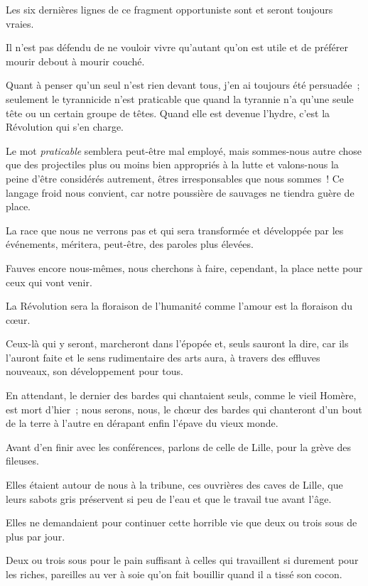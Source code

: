 \documentclass[french,twoside]{book} %
\begin{document}
\noindent Les six dernières lignes de ce fragment opportuniste sont et seront toujours vraies.\par
Il n’est pas défendu de ne vouloir vivre qu’autant qu’on est utile et de préférer mourir debout à mourir couché.\par
Quant à penser qu’un seul n’est rien devant tous, j’en ai toujours été persuadée ; seulement  le tyrannicide n’est praticable que quand la tyrannie n’a qu’une seule tête ou un certain groupe de têtes. Quand elle est devenue l’hydre, c’est la Révolution qui s’en charge.\par
Le mot \emph{praticable} semblera peut-être mal employé, mais sommes-nous autre chose que des projectiles plus ou moins bien appropriés à la lutte et valons-nous la peine d’être considérés autrement, êtres irresponsables que nous sommes ! Ce langage froid nous convient, car notre poussière de sauvages ne tiendra guère de place.\par
La race que nous ne verrons pas et qui sera transformée et développée par les événements, méritera, peut-être, des paroles plus élevées.\par
Fauves encore nous-mêmes, nous cherchons à faire, cependant, la place nette pour ceux qui vont venir.\par
La Révolution sera la floraison de l’humanité comme l’amour est la floraison du cœur.\par
Ceux-là qui y seront, marcheront dans l’épopée et, seuls sauront la dire, car ils l’auront faite et le sens rudimentaire des arts aura, à travers des effluves nouveaux, son développement pour tous.\par
En attendant, le dernier des bardes qui chantaient seuls, comme le vieil Homère, est mort d’hier ; nous serons, nous, le chœur des bardes  qui chanteront d’un bout de la terre à l’autre en dérapant enfin l’épave du vieux monde.\par
Avant d’en finir avec les conférences, parlons de celle de Lille, pour la grève des fileuses.\par
Elles étaient autour de nous à la tribune, ces ouvrières des caves de Lille, que leurs sabots gris préservent si peu de l’eau et que le travail tue avant l’âge.\par
Elles ne demandaient pour continuer cette horrible vie que deux ou trois sous de plus par jour.\par
Deux ou trois sous pour le pain suffisant à celles qui travaillent si durement pour les riches, pareilles au ver à soie qu’on fait bouillir quand il a tissé son cocon.\par
\end{document}
